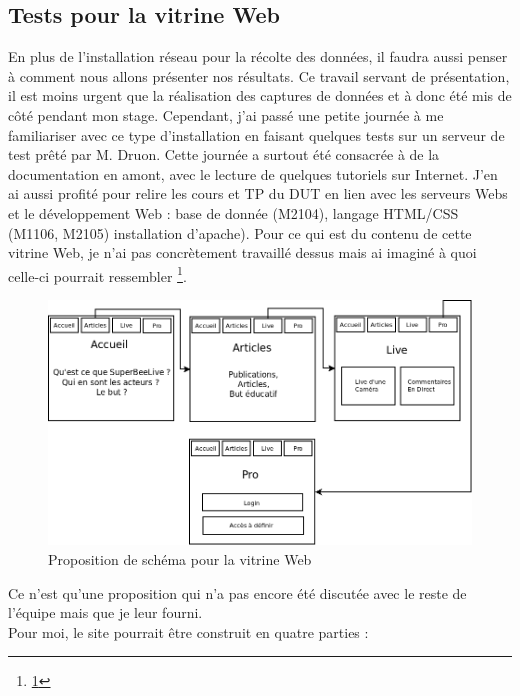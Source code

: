 \documentclass[11pt,french,a4paper]{report}
\begin{document}
        \subsection{Tests pour la vitrine Web}
En plus de l'installation réseau pour la récolte des données, il faudra aussi penser à comment nous allons présenter nos 
résultats. Ce travail servant de présentation, il est moins urgent que la réalisation des captures de données et à donc été mis de 
côté pendant mon stage. Cependant, j'ai passé une petite journée à me familiariser avec ce type d'installation en faisant 
quelques tests sur un serveur de test prêté par M. Druon. Cette journée a surtout été consacrée à de la documentation en amont,
avec le lecture de quelques tutoriels sur Internet. J'en ai aussi profité pour relire les cours et 
TP du DUT en lien avec les serveurs Webs et le développement Web : base de donnée (M2104), langage HTML/CSS (M1106, M2105)
installation d'apache). 
Pour ce qui est du contenu de cette vitrine Web, je n'ai pas concrètement travaillé dessus mais ai imaginé à quoi celle-ci pourrait
ressembler \footnote{\ref{sch_web}}. \\
\begin{figure}[!h]
    \centering
    \includegraphics[scale=0.5]{../images/dia/sch_web.png}
    \caption{Proposition de schéma pour la vitrine Web}
    \label{sch_web}
\end{figure}
Ce n'est qu'une proposition qui n'a pas encore été discutée avec le reste de l'équipe mais que je leur fourni. \\
Pour moi, le site pourrait être construit en quatre parties : 
\end{document}
